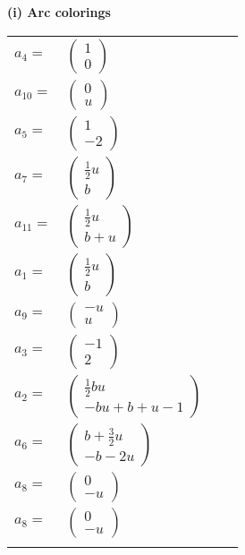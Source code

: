 \documentclass[1p]{elsarticle_modified}
\theoremstyle{definition}
\begin{document}
\flushleft \textbf{(i) Arc colorings}\\
\begin{tabular}{m{7pt} m{180pt} m{7pt} m{180pt} }
\flushright $a_{4}=$&$\begin{pmatrix}1\\0\end{pmatrix}$ \\
\flushright $a_{10}=$&$\begin{pmatrix}0\\u\end{pmatrix}$ \\
\flushright $a_{5}=$&$\begin{pmatrix}1\\-2\end{pmatrix}$ \\
\flushright $a_{7}=$&$\begin{pmatrix}\frac{1}{2} u\\b\end{pmatrix}$ \\
\flushright $a_{11}=$&$\begin{pmatrix}\frac{1}{2} u\\b+u\end{pmatrix}$ \\
\flushright $a_{1}=$&$\begin{pmatrix}\frac{1}{2} u\\b\end{pmatrix}$ \\
\flushright $a_{9}=$&$\begin{pmatrix}- u\\u\end{pmatrix}$ \\
\flushright $a_{3}=$&$\begin{pmatrix}-1\\2\end{pmatrix}$ \\
\flushright $a_{2}=$&$\begin{pmatrix}\frac{1}{2} b u\\- b u+b+u-1\end{pmatrix}$ \\
\flushright $a_{6}=$&$\begin{pmatrix}b+\frac{3}{2} u\\- b-2 u\end{pmatrix}$ \\
\flushright $a_{8}=$&$\begin{pmatrix}0\\- u\end{pmatrix}$\\ \flushright $a_{8}=$&$\begin{pmatrix}0\\- u\end{pmatrix}$\\&\end{tabular}
\end{document}
